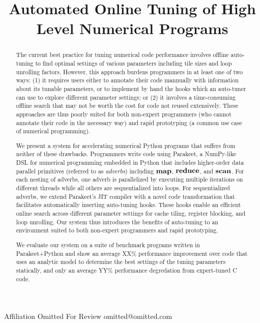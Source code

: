 \documentclass[preprint,9pt]{sigplanconf}
\begin{document}
\copyrightdata{[to be supplied]} 

\titlebanner{}        %

\title{Automated Online Tuning of High Level Numerical Programs}

           {Affiliation Omitted For Review}
           {omitted@omitted.com}

\newcommand{\MAP}{\impfnt{map}}
\newcommand{\REDUCE}{\impfnt{reduce}}
\newcommand{\SCAN}{\impfnt{scan}}
\newcommand{\ALLPAIRS}{\impfnt{allpairs}}
\newcommand{\concat}{\ensuremath{+\!\!\!\!+\,}}

\maketitle

\begin{abstract}
The current best practice for tuning numerical code performance involves offline auto-tuning to find optimal settings of various parameters including tile sizes and loop unrolling factors.  However, this approach burdens programmers in at least one of two ways: (1) it requires users either to annotate their code mannually with information about its tunable parameters, or to implement by hand the hooks which an auto-tuner can use to explore different parameter settings; or (2) it involves a time-consuming offline search that may not be worth the cost for code not reused extensively.  These approaches are thus poorly suited for both non-expert programmers (who cannot annotate their code in the necessary way) and rapid prototyping (a common use case of numerical programming).

We present a system for accelerating numerical Python programs that suffers from neither of these drawbacks. Programmers write code using Parakeet, a NumPy-like DSL for numerical programming embedded in Python that includes higher-order data parallel primitives (referred to as \emph{adverbs}) including $\MAP$, $\REDUCE$, and $\SCAN$.  For each nesting of adverbs, one adverb is parallelized by executing multiple iterations on different threads while all others are sequentialized into loops.  For sequentialized adverbs, we extend Parakeet's JIT compiler with a novel code transformation that facilitates automatically inserting auto-tuning hooks.  These hooks enable an efficient online search across different parameter settings for cache tiling, register blocking, and loop unrolling.  Our system thus introduces the benefits of auto-tuning to an environment suited to both non-expert programmers and rapid prototyping.

We evaluate our system on a suite of benchmark programs written in Parakeet+Python and show an average XX\% performance improvement over code that uses an analytic model to determine the best settings of the tuning parameters statically, and only an average YY\% performance degredation from expert-tuned C code.
\end{abstract}
\end{document}
